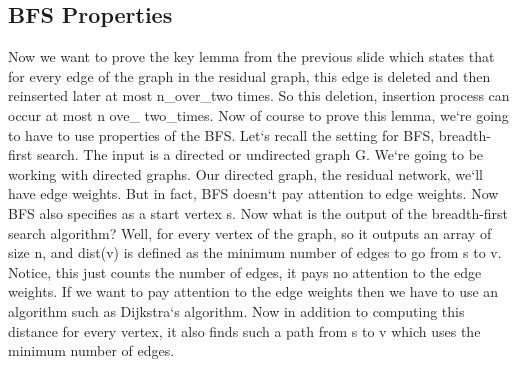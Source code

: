 \subsection{BFS Properties}
Now we want to prove the key lemma from the previous slide which states that for every edge of the graph in the residual graph, this edge is deleted and then reinserted later at most n\_over\_two times.
So this deletion, insertion process can occur at most n ove\_ two\_times.
Now of course to prove this lemma, we`re going to have to use properties of the BFS\@.
Let`s recall the setting for BFS, breadth-first search.
The input is a directed or undirected graph G\@.
We`re going to be working with directed graphs.
Our directed graph, the residual network, we`ll have edge weights.
But in fact, BFS doesn`t pay attention to edge weights.
Now BFS also specifies as a start vertex s.
Now what is the output of the breadth-first search algorithm? Well, for every vertex of the graph, so it outputs an array of size n, and dist(v) is defined as the minimum number of edges to go from s to v.
Notice, this just counts the number of edges, it pays no attention to the edge weights.
If we want to pay attention to the edge weights then we have to use an algorithm such as Dijkstra`s algorithm.
Now in addition to computing this distance for every vertex, it also finds such a path from s to v which uses the minimum number of edges.

